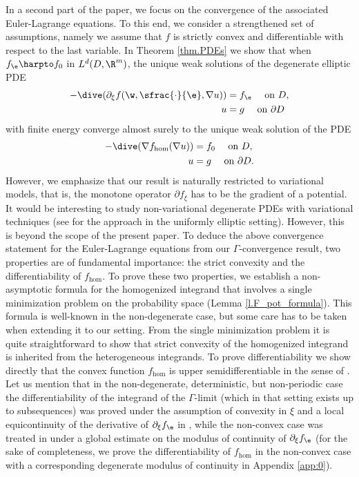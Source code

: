 In a second part of the paper, we focus on the convergence of the associated Euler-Lagrange equations. To this end, we consider a strengthened set of assumptions, namely we assume that $f$ is strictly convex and differentiable with respect to the last variable. In Theorem \ref{thm.PDEs} we show that when $f_{\e}\harpto f_0$ in $L^d(D,\R^m)$, the unique weak solutions of the degenerate elliptic PDE
\begin{align*}
-\dive(\partial_{\xi }f(\w,\sfrac{\cdot}{\e},\nabla u))&=f_{\e}\quad\text{ on }D,
\\
u&=g\quad\text{ on }\partial D
\end{align*}
with finite energy converge almost surely to the unique weak solution of the PDE
\begin{align*}
-\dive(\nabla f_{\hom}(\nabla u))&=f_0\quad\text{ on }D,
\\
u&=g\quad\text{ on }\partial D.
\end{align*}
However, we emphasize that our result is naturally restricted to variational models, that is, the monotone operator $\partial f_{\xi}$ has to be the gradient of a potential. It would be interesting to study non-variational degenerate PDEs with variational techniques (see \cite{ArMo} for the approach in the uniformly elliptic setting). However, this is beyond the scope of the present paper. To deduce the above convergence statement for the Euler-Lagrange equations from our $\Gamma$-convergence result, two properties are of fundamental importance: the strict convexity and the differentiability of $f_{\hom}$. To prove these two properties, we establish a non-asymptotic formula for the homogenized integrand that involves a single minimization problem on the probability space (\cf Lemma \ref{l.F_pot_formula}). This formula is well-known in the non-degenerate case, but some care has to be taken when extending it to our setting. From the single minimization problem it is quite straightforward to show that strict convexity of the homogenized integrand is inherited from the heterogeneous integrands. To prove differentiability we show directly that the convex function $f_{\hom}$ is upper semidifferentiable in the sense of \cite{BKK}. Let us mention that in the non-degenerate, deterministic, but non-periodic case the differentiability of the integrand of the $\Gamma$-limit (which in that setting exists up to subsequences) was proved under the assumption of convexity in $\xi$ and a local equicontinuity of the derivative of $\partial_{\xi}f_{\e}$ in \cite[Prop.\,3.5]{GiPo}, while the non-convex case was treated in \cite[Th.\,2.8]{ADMZ} under a global estimate on the modulus of continuity of $\partial_{\xi}f_{\e}$ (for the sake of completeness, we prove the differentiability of $f_{\hom}$ in the non-convex case with a corresponding degenerate modulus of continuity in Appendix \ref{app:0}).

